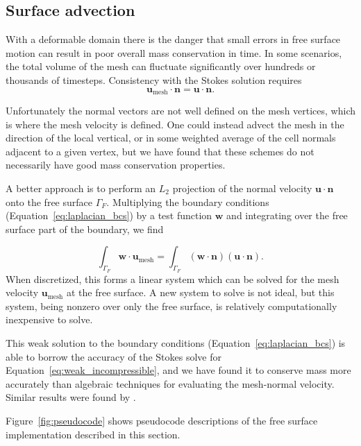 \documentclass[preprint,12pt,authoryear]{elsarticle}
\begin{document}
\subsection{Surface advection}
With a deformable domain there is the danger that small errors in free surface motion can
result in poor overall mass conservation in time. In some scenarios, the total volume of the mesh can 
fluctuate significantly over hundreds or thousands of timesteps.
Consistency with the Stokes solution requires 
\begin{equation}
\mathbf{u}_{\mathrm{mesh}} \cdot \mathbf{n} = \mathbf{u \cdot n}.
\end{equation}

Unfortunately the normal vectors are not well defined on the mesh vertices, which is 
where the mesh velocity is defined. One could instead advect the mesh in the direction 
of the local vertical, or in some weighted average of the cell normals adjacent to a given vertex,
but we have found that these schemes do not necessarily have good mass conservation 
properties.

A better approach is to perform an $L_2$ projection of the normal velocity $\mathbf{u}\cdot\mathbf{n}$
onto the free surface $\Gamma_F$. Multiplying the boundary conditions 
(Equation~\eqref{eq:laplacian_bcs}) by a test function $\mathbf{w}$ and integrating over the free
surface part of the boundary, we find

\begin{equation}
\int_{\Gamma_F} \mathbf{w} \cdot \mathbf{u}_\mathrm{mesh} = 
\int_{\Gamma_F} \left( \mathbf{w \cdot n } \right) \left( \mathbf{u \cdot n} \right).
  \label{eq:mesh_velocity_system}
\end{equation}
When discretized, this forms a linear system which can be solved for the mesh velocity $\mathbf{u}_\mathrm{mesh}$ at the 
free surface. A new system to solve is not ideal, but this system, being nonzero 
over only the free surface, is relatively computationally inexpensive to solve.

This weak solution to the boundary conditions (Equation~\eqref{eq:laplacian_bcs}) is able to borrow
the accuracy of the Stokes solve for Equation~\eqref{eq:weak_incompressible}, and we have 
found it to conserve mass more accurately than algebraic techniques for evaluating the mesh-normal velocity.
Similar results were found by \citet{fullsack1995arbitrary}.

Figure~\ref{fig:pseudocode} shows pseudocode descriptions of the free surface implementation described in this section.
\end{document}
